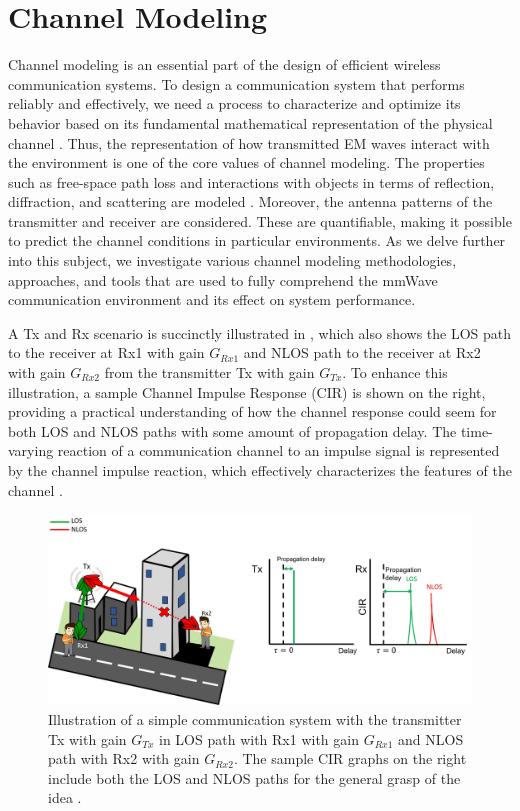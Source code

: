 \section{Channel Modeling } \label{Channel Modeling}
Channel modeling is an essential part of the design of efficient wireless communication systems. To design a communication system that performs reliably and effectively, we need a process to characterize and optimize its behavior based on its fundamental mathematical representation of the physical channel \cite{Rappaport, rappaport2015millimeter}. Thus, the representation of how transmitted EM waves interact with the environment is one of the core values of channel modeling. The properties such as free-space path loss and interactions with objects in terms of reflection, diffraction, and scattering are modeled \cite{rappaport2015millimeter, electronics12092014}. Moreover, the antenna patterns of the transmitter and receiver are considered. These are quantifiable, making it possible to predict the channel conditions in particular environments. As we delve further into this subject, we investigate various channel modeling methodologies, approaches, and tools that are used to fully comprehend the \ac{mmWave} communication environment and its effect on system performance.

A Tx and Rx scenario is succinctly illustrated in , which also shows the LOS path to the receiver at Rx1 with gain $G_{Rx1}$ and NLOS path to the receiver at Rx2 with gain $G_{Rx2}$ from the transmitter Tx with gain $G_{Tx}$. To enhance this illustration, a sample Channel Impulse Response (CIR) is shown on the right, providing a practical understanding of how the channel response could seem for both LOS and NLOS paths with some amount of propagation delay. The time-varying reaction of a communication channel to an impulse signal is represented by the channel impulse reaction, which effectively characterizes the features of the channel \cite{ITUReport}.

\begin{figure}[tb]
	\centering
	\includegraphics[width=1.0\linewidth]{images/Section 2 Images/TxRx}
	\caption{Illustration of a simple communication system with the transmitter Tx with gain $G_{Tx}$ in LOS path with Rx1 with gain $G_{Rx1}$ and NLOS path with Rx2 with gain $G_{Rx2}$. The sample CIR graphs on the right include both the LOS and NLOS paths for the general grasp of the idea \cite{ITUReport}.}
	\label{fig:TxRx}
\end{figure}
